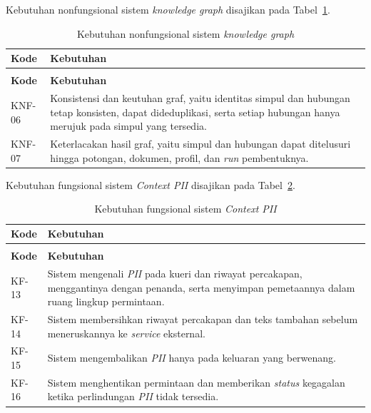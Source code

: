 \noindent Kebutuhan nonfungsional sistem \emph{knowledge graph} disajikan pada Tabel~\ref{tab:knf-knowledge-graph}.

\begin{longtable}{>{\RaggedRight\arraybackslash}p{2.2cm} >{\RaggedRight\arraybackslash}p{10.65cm}}
    \caption{Kebutuhan nonfungsional sistem \emph{knowledge graph}}\label{tab:knf-knowledge-graph}\\
    \toprule
    \textbf{Kode} & \textbf{Kebutuhan}\\
    \midrule
    \endfirsthead
    \multicolumn{2}{l}{\small\itshape Lanjutan Tabel \ref{tab:knf-knowledge-graph}}\\
    \toprule
    \textbf{Kode} & \textbf{Kebutuhan}\\
    \midrule
    \endhead
    \bottomrule
    \endfoot
    KNF-06 & Konsistensi dan keutuhan graf, yaitu identitas simpul dan hubungan tetap konsisten, dapat dideduplikasi, serta setiap hubungan hanya merujuk pada simpul yang tersedia.\\
    KNF-07 & Keterlacakan hasil graf, yaitu simpul dan hubungan dapat ditelusuri hingga potongan, dokumen, profil, dan \emph{run} pembentuknya.\\
\end{longtable}

\noindent Kebutuhan fungsional sistem \emph{Context PII} disajikan pada Tabel~\ref{tab:kf-context-pii}.

\begin{longtable}{>{\RaggedRight\arraybackslash}p{2.2cm} >{\RaggedRight\arraybackslash}p{10.65cm}}
    \caption{Kebutuhan fungsional sistem \emph{Context PII}}\label{tab:kf-context-pii}\\
    \toprule
    \textbf{Kode} & \textbf{Kebutuhan}\\
    \midrule
    \endfirsthead
    \multicolumn{2}{l}{\small\itshape Lanjutan Tabel \ref{tab:kf-context-pii}}\\
    \toprule
    \textbf{Kode} & \textbf{Kebutuhan}\\
    \midrule
    \endhead
    \bottomrule
    \endfoot
    KF-13 & Sistem mengenali \emph{PII} pada kueri dan riwayat percakapan, menggantinya dengan penanda, serta menyimpan pemetaannya dalam ruang lingkup permintaan.\\
    KF-14 & Sistem membersihkan riwayat percakapan dan teks tambahan sebelum meneruskannya ke \emph{service} eksternal.\\
    KF-15 & Sistem mengembalikan \emph{PII} hanya pada keluaran yang berwenang.\\
    KF-16 & Sistem menghentikan permintaan dan memberikan \emph{status} kegagalan ketika perlindungan \emph{PII} tidak tersedia.\\
\end{longtable}

